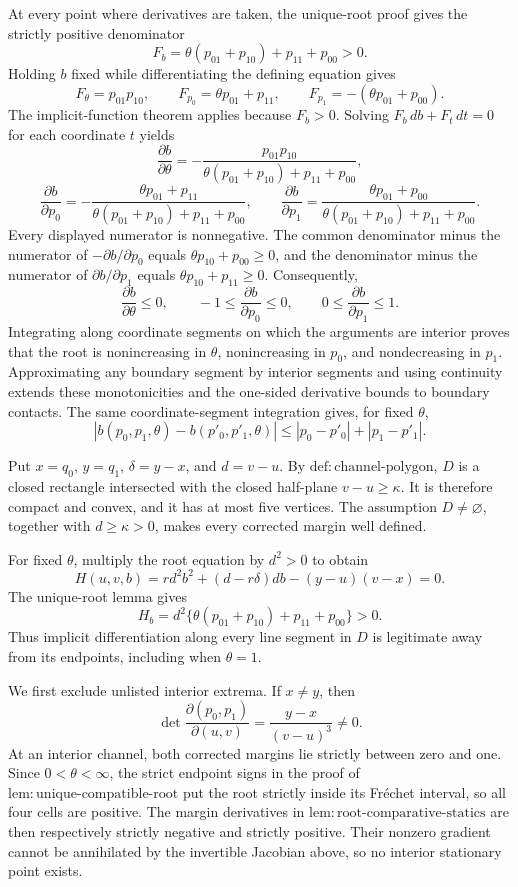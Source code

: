 At every point where derivatives are taken, the unique-root proof gives the strictly positive denominator
\[
F_b=\theta(p_{01}+p_{10})+p_{11}+p_{00}>0.
\]
Holding \(b\) fixed while differentiating the defining equation gives
\[
F_\theta=p_{01}p_{10},\qquad
F_{p_0}=\theta p_{01}+p_{11},\qquad
F_{p_1}=-(\theta p_{01}+p_{00}).
\]
The implicit-function theorem applies because \(F_b>0\). Solving \(F_b\,db+F_t\,dt=0\) for each coordinate \(t\) yields
\[
\frac{\partial b}{\partial\theta}
=-\frac{p_{01}p_{10}}
{\theta(p_{01}+p_{10})+p_{11}+p_{00}},
\]
\[
\frac{\partial b}{\partial p_0}
=-\frac{\theta p_{01}+p_{11}}
{\theta(p_{01}+p_{10})+p_{11}+p_{00}},
\qquad
\frac{\partial b}{\partial p_1}
=\frac{\theta p_{01}+p_{00}}
{\theta(p_{01}+p_{10})+p_{11}+p_{00}}.
\]
Every displayed numerator is nonnegative. The common denominator minus the numerator of \(-\partial b/\partial p_0\) equals \(\theta p_{10}+p_{00}\geq0\), and the denominator minus the numerator of \(\partial b/\partial p_1\) equals \(\theta p_{10}+p_{11}\geq0\). Consequently,
\[
\frac{\partial b}{\partial\theta}\leq0,
\qquad
-1\leq\frac{\partial b}{\partial p_0}\leq0,
\qquad
0\leq\frac{\partial b}{\partial p_1}\leq1.
\]
Integrating along coordinate segments on which the arguments are interior proves that the root is nonincreasing in \(\theta\), nonincreasing in \(p_0\), and nondecreasing in \(p_1\). Approximating any boundary segment by interior segments and using continuity extends these monotonicities and the one-sided derivative bounds to boundary contacts. The same coordinate-segment integration gives, for fixed \(\theta\),
\[
|b(p_0,p_1,\theta)-b(p'_0,p'_1,\theta)|
\leq |p_0-p'_0|+|p_1-p'_1|.
\]

Put \(x=q_0\), \(y=q_1\), \(\delta=y-x\), and \(d=v-u\). By \(\mathrm{def:channel\text{-}polygon}\), \(D\) is a closed rectangle intersected with the closed half-plane \(v-u\geq\kappa\). It is therefore compact and convex, and it has at most five vertices. The assumption \(D\neq\varnothing\), together with \(d\geq\kappa>0\), makes every corrected margin well defined.

For fixed \(\theta\), multiply the root equation by \(d^2>0\) to obtain
\[
H(u,v,b)
=r d^2b^2+(d-r\delta)d b-(y-u)(v-x)=0.
\]
The unique-root lemma gives
\[
H_b=d^2\{\theta(p_{01}+p_{10})+p_{11}+p_{00}\}>0.
\]
Thus implicit differentiation along every line segment in \(D\) is legitimate away from its endpoints, including when \(\theta=1\).

We first exclude unlisted interior extrema. If \(x\neq y\), then
\[
\det\frac{\partial(p_0,p_1)}{\partial(u,v)}
=\frac{y-x}{(v-u)^3}\neq0.
\]
At an interior channel, both corrected margins lie strictly between zero and one. Since \(0<\theta<\infty\), the strict endpoint signs in the proof of \(\mathrm{lem:unique\text{-}compatible\text{-}root}\) put the root strictly inside its Fr\'echet interval, so all four cells are positive. The margin derivatives in \(\mathrm{lem:root\text{-}comparative\text{-}statics}\) are then respectively strictly negative and strictly positive. Their nonzero gradient cannot be annihilated by the invertible Jacobian above, so no interior stationary point exists.

